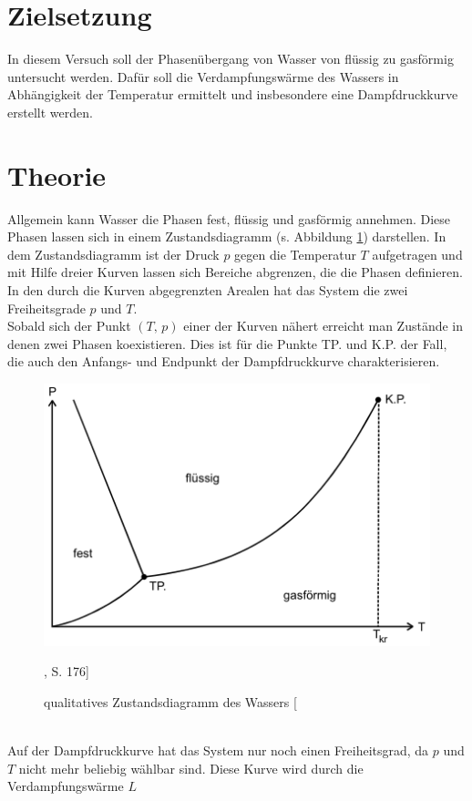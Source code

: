 \section{Zielsetzung}
In diesem Versuch soll der Phasenübergang von Wasser von flüssig zu gasförmig untersucht werden.
Dafür soll die Verdampfungswärme des Wassers in Abhängigkeit der Temperatur ermittelt und insbesondere eine Dampfdruckkurve
erstellt werden.

\section{Theorie}
\label{sec:Theorie}
Allgemein kann Wasser die Phasen fest, flüssig und gasförmig annehmen. Diese Phasen lassen sich in einem Zustandsdiagramm (s. Abbildung \ref{fig:pV-Diagramm})
darstellen. In dem Zustandsdiagramm ist der Druck $p$ gegen die Temperatur $T$ aufgetragen und mit Hilfe dreier Kurven lassen sich Bereiche abgrenzen, die 
die Phasen definieren. In den durch die Kurven abgegrenzten Arealen hat das System die zwei Freiheitsgrade $p$ und $T$.\\
Sobald sich der Punkt $(T{,}\,p)$ einer der Kurven nähert erreicht man Zustände in denen zwei Phasen koexistieren. Dies ist für die Punkte TP. und K.P. der Fall, die
auch den Anfangs- und Endpunkt der Dampfdruckkurve charakterisieren.\\
\begin{figure}
    \centering
    \includegraphics{Theorie1.png}
    \caption{qualitatives Zustandsdiagramm des Wassers [\cite{sample}}, S. 176]
    \label{fig:pV-Diagramm}
\end{figure}
\\
Auf der Dampfdruckkurve hat das System nur noch einen Freiheitsgrad, da $p$ und $T$ nicht mehr beliebig wählbar sind. Diese Kurve wird durch die Verdampfungswärme $L$
